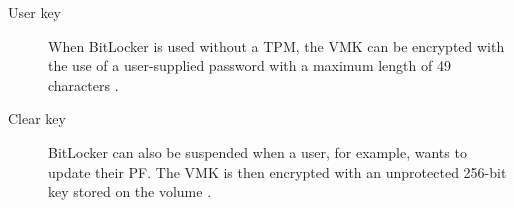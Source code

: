 \begin{description}
    \item[User key] When BitLocker is used without a \ac{TPM}, the \ac{VMK} can be encrypted with the use of a user-supplied password with a maximum length of 49 characters \cite[Section 2.7]{bde-format-spec}.

    \item[Clear key] BitLocker can also be suspended when a user, for example, wants to update their \ac{PF}.
        The \ac{VMK} is then encrypted with an unprotected 256-bit key stored on the volume \cite[Section 2.5]{bde-format-spec}.

\end{description}